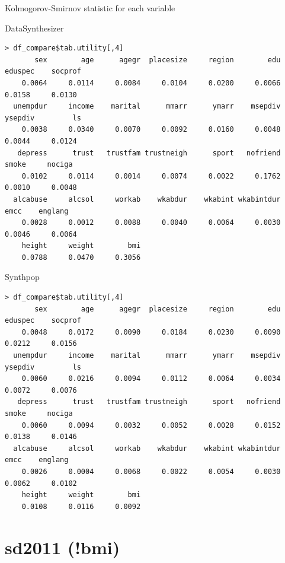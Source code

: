 \documentclass[xcolor=table]{beamer}
\begin{document}
\begin{frame}[fragile]{Kolmogorov-Smirnov statistic for each variable}

DataSynthesizer
\begin{lstlisting}[firstnumber=1, label=glabels, xleftmargin=10pt,frame=single] 
> df_compare$tab.utility[,4]
       sex        age      agegr  placesize     region        edu    eduspec    socprof 
    0.0064     0.0114     0.0084     0.0104     0.0200     0.0066     0.0158     0.0130 
  unempdur     income    marital      mmarr      ymarr    msepdiv    ysepdiv         ls 
    0.0038     0.0340     0.0070     0.0092     0.0160     0.0048     0.0044     0.0124 
   depress      trust   trustfam trustneigh      sport   nofriend      smoke     nociga 
    0.0102     0.0114     0.0014     0.0074     0.0022     0.1762     0.0010     0.0048 
  alcabuse     alcsol     workab    wkabdur    wkabint wkabintdur       emcc    englang 
    0.0028     0.0012     0.0088     0.0040     0.0064     0.0030     0.0046     0.0064 
    height     weight        bmi 
    0.0788     0.0470     0.3056 
\end{lstlisting}
Synthpop
\begin{lstlisting}[firstnumber=1, label=glabels, xleftmargin=10pt,frame=single] 
> df_compare$tab.utility[,4]
       sex        age      agegr  placesize     region        edu    eduspec    socprof 
    0.0048     0.0172     0.0090     0.0184     0.0230     0.0090     0.0212     0.0156 
  unempdur     income    marital      mmarr      ymarr    msepdiv    ysepdiv         ls 
    0.0060     0.0216     0.0094     0.0112     0.0064     0.0034     0.0072     0.0076 
   depress      trust   trustfam trustneigh      sport   nofriend      smoke     nociga 
    0.0060     0.0094     0.0032     0.0052     0.0028     0.0152     0.0138     0.0146 
  alcabuse     alcsol     workab    wkabdur    wkabint wkabintdur       emcc    englang 
    0.0026     0.0004     0.0068     0.0022     0.0054     0.0030     0.0062     0.0102 
    height     weight        bmi 
    0.0108     0.0116     0.0092 
\end{lstlisting}

\end{frame}

\section{sd2011 (!bmi)}
\end{document}
